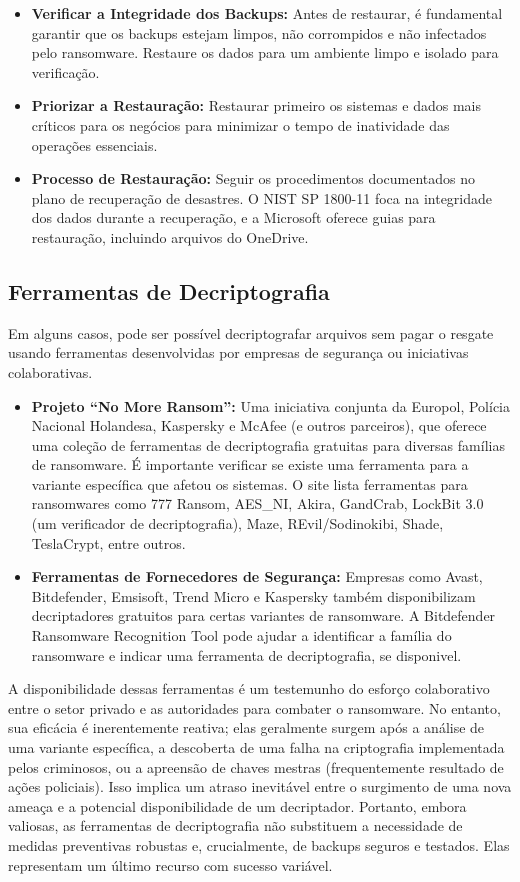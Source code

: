 \begin{itemize}
    \item \textbf{Verificar a Integridade dos Backups:} Antes de restaurar, é fundamental garantir que os backups estejam limpos, não corrompidos e não infectados pelo ransomware. Restaure os dados para um ambiente limpo e isolado para verificação.
    \item \textbf{Priorizar a Restauração:} Restaurar primeiro os sistemas e dados mais críticos para os negócios para minimizar o tempo de inatividade das operações essenciais.
    \item \textbf{Processo de Restauração:} Seguir os procedimentos documentados no plano de recuperação de desastres. O NIST SP 1800-11 foca na integridade dos dados durante a recuperação, e a Microsoft oferece guias para restauração, incluindo arquivos do OneDrive.
\end{itemize}

\subsection{Ferramentas de Decriptografia}
Em alguns casos, pode ser possível decriptografar arquivos sem pagar o resgate usando ferramentas desenvolvidas por empresas de segurança ou iniciativas colaborativas.

\begin{itemize}
    \item \textbf{Projeto ``No More Ransom'':} Uma iniciativa conjunta da Europol, Polícia Nacional Holandesa, Kaspersky e McAfee (e outros parceiros), que oferece uma coleção de ferramentas de decriptografia gratuitas para diversas famílias de ransomware. É importante verificar se existe uma ferramenta para a variante específica que afetou os sistemas. O site lista ferramentas para ransomwares como 777 Ransom, AES\_NI, Akira, GandCrab, LockBit 3.0 (um verificador de decriptografia), Maze, REvil/Sodinokibi, Shade, TeslaCrypt, entre outros.
    \item \textbf{Ferramentas de Fornecedores de Segurança:} Empresas como Avast, Bitdefender, Emsisoft, Trend Micro e Kaspersky também disponibilizam decriptadores gratuitos para certas variantes de ransomware. A Bitdefender Ransomware Recognition Tool pode ajudar a identificar a família do ransomware e indicar uma ferramenta de decriptografia, se disponivel.
\end{itemize}

A disponibilidade dessas ferramentas é um testemunho do esforço colaborativo entre o setor privado e as autoridades para combater o ransomware. No entanto, sua eficácia é inerentemente reativa; elas geralmente surgem após a análise de uma variante específica, a descoberta de uma falha na criptografia implementada pelos criminosos, ou a apreensão de chaves mestras (frequentemente resultado de ações policiais). Isso implica um atraso inevitável entre o surgimento de uma nova ameaça e a potencial disponibilidade de um decriptador. Portanto, embora valiosas, as ferramentas de decriptografia não substituem a necessidade de medidas preventivas robustas e, crucialmente, de backups seguros e testados. Elas representam um último recurso com sucesso variável.

